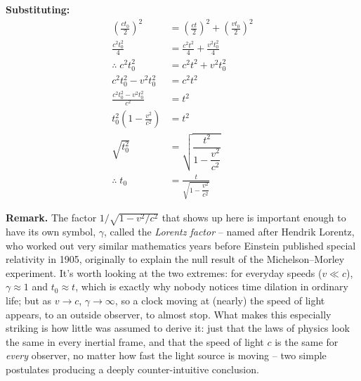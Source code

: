 \noindent
\textbf{Substituting:}
\begin{align*}
\left(\frac{c t_0}{2}\right)^2 &= \left(\frac{ct}{2}\right)^2 + \left(\frac{v t_0}{2}\right)^2 \\[6pt]
\frac{c^2 t_0^2}{4} &= \frac{c^2 t^2}{4} + \frac{v^2 t_0^2}{4} \\[6pt]
\therefore\; c^2 t_0^2 &= c^2 t^2 + v^2 t_0^2 \\[6pt]
c^2 t_0^2 - v^2 t_0^2 &= c^2 t^2 \\[6pt]
\frac{c^2 t_0^2 - v^2 t_0^2}{c^2} &= t^2 \\[6pt]
t_0^2 \left(1 - \frac{v^2}{c^2}\right) &= t^2 \\[6pt]
\sqrt{t_0^2} &= \sqrt{\dfrac{t^2}{1 - \dfrac{v^2}{c^2}}} \\[6pt]
\therefore\; t_0 &= \frac{t}{\sqrt{1 - \dfrac{v^2}{c^2}}}
\end{align*}
\begin{center}
\end{center}

\bigskip
\noindent\textbf{Remark.} The factor $1/\sqrt{1-v^2/c^2}$ that shows up here is important enough to have its own symbol, $\gamma$, called the \emph{Lorentz factor} -- named after Hendrik Lorentz, who worked out very similar mathematics years before Einstein published special relativity in 1905, originally to explain the null result of the Michelson--Morley experiment. It's worth looking at the two extremes: for everyday speeds ($v \ll c$), $\gamma \approx 1$ and $t_0 \approx t$, which is exactly why nobody notices time dilation in ordinary life; but as $v \to c$, $\gamma \to \infty$, so a clock moving at (nearly) the speed of light appears, to an outside observer, to almost stop. What makes this especially striking is how little was assumed to derive it: just that the laws of physics look the same in every inertial frame, and that the speed of light $c$ is the same for \emph{every} observer, no matter how fast the light source is moving -- two simple postulates producing a deeply counter-intuitive conclusion.
